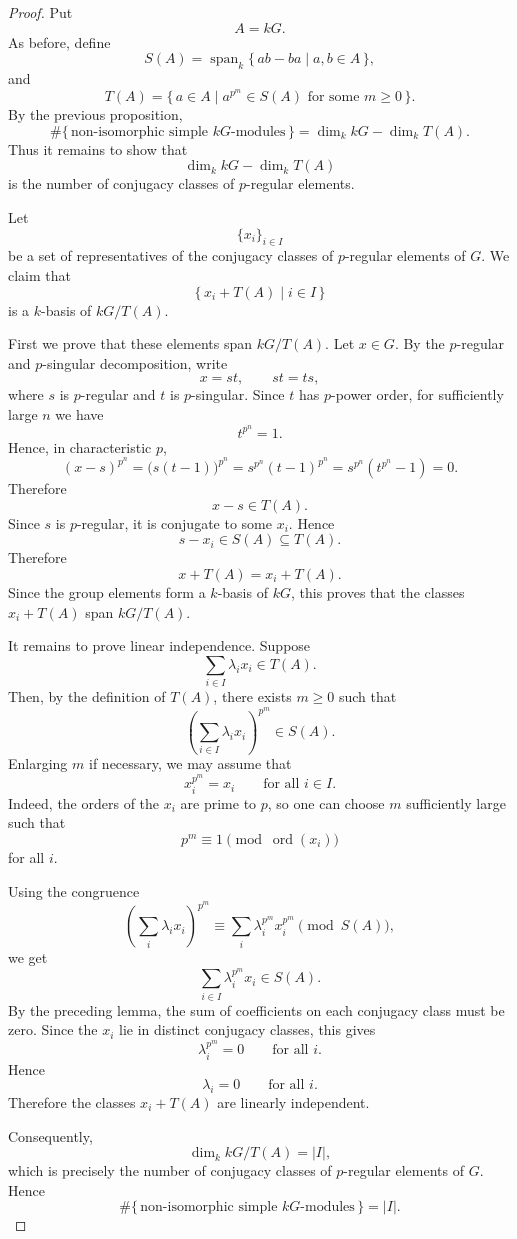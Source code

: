 \begin{proof}
    Put
    \[
        A=kG.
    \]
    As before, define
    \[
        S(A)=\operatorname{span}_k\{\,ab-ba\mid a,b\in A\,\},
    \]
    and
    \[
        T(A)=\{\,a\in A\mid a^{p^m}\in S(A)
        \text{ for some }m\geq 0\,\}.
    \]
    By the previous proposition,
    \[
        \#\{\,\text{non-isomorphic simple }kG\text{-modules}\,\}
        =
        \dim_k kG-\dim_k T(A).
    \]
    Thus it remains to show that
    \[
        \dim_k kG-\dim_k T(A)
    \]
    is the number of conjugacy classes of \(p\)-regular elements.

    Let
    \[
        \{x_i\}_{i\in I}
    \]
    be a set of representatives of the conjugacy classes of \(p\)-regular elements of
    \(G\). We claim that
    \[
        \{\,x_i+T(A)\mid i\in I\,\}
    \]
    is a \(k\)-basis of \(kG/T(A)\).

    First we prove that these elements span \(kG/T(A)\). Let \(x\in G\). By the
    \(p\)-regular and \(p\)-singular decomposition, write
    \[
        x=st,
        \qquad
        st=ts,
    \]
    where \(s\) is \(p\)-regular and \(t\) is \(p\)-singular. Since \(t\) has \(p\)-power
    order, for sufficiently large \(n\) we have
    \[
        t^{p^n}=1.
    \]
    Hence, in characteristic \(p\),
    \[
        (x-s)^{p^n}
        =
        \bigl(s(t-1)\bigr)^{p^n}
        =
        s^{p^n}(t-1)^{p^n}
        =
        s^{p^n}(t^{p^n}-1)
        =
        0.
    \]
    Therefore
    \[
        x-s\in T(A).
    \]
    Since \(s\) is \(p\)-regular, it is conjugate to some \(x_i\). Hence
    \[
        s-x_i\in S(A)\subseteq T(A).
    \]
    Therefore
    \[
        x+T(A)=x_i+T(A).
    \]
    Since the group elements form a \(k\)-basis of \(kG\), this proves that the classes
    \(x_i+T(A)\) span \(kG/T(A)\).

    It remains to prove linear independence. Suppose
    \[
        \sum_{i\in I}\lambda_i x_i\in T(A).
    \]
    Then, by the definition of \(T(A)\), there exists \(m\geq 0\) such that
    \[
        \left(\sum_{i\in I}\lambda_i x_i\right)^{p^m}\in S(A).
    \]
    Enlarging \(m\) if necessary, we may assume that
    \[
        x_i^{p^m}=x_i
        \qquad
        \text{for all }i\in I.
    \]
    Indeed, the orders of the \(x_i\) are prime to \(p\), so one can choose \(m\)
    sufficiently large such that
    \[
        p^m\equiv 1\pmod{\operatorname{ord}(x_i)}
    \]
    for all \(i\).

    Using the congruence
    \[
        \left(\sum_i \lambda_i x_i\right)^{p^m}
        \equiv
        \sum_i \lambda_i^{p^m}x_i^{p^m}
        \pmod{S(A)},
    \]
    we get
    \[
        \sum_{i\in I}\lambda_i^{p^m}x_i\in S(A).
    \]
    By the preceding lemma, the sum of coefficients on each conjugacy class must be
    zero. Since the \(x_i\) lie in distinct conjugacy classes, this gives
    \[
        \lambda_i^{p^m}=0
        \qquad
        \text{for all }i.
    \]
    Hence
    \[
        \lambda_i=0
        \qquad
        \text{for all }i.
    \]
    Therefore the classes \(x_i+T(A)\) are linearly independent.

    Consequently,
    \[
        \dim_k kG/T(A)
        =
        |I|,
    \]
    which is precisely the number of conjugacy classes of \(p\)-regular elements of
    \(G\). Hence
    \[
        \#\{\,\text{non-isomorphic simple }kG\text{-modules}\,\}
        =
        |I|.
    \]
\end{proof}

